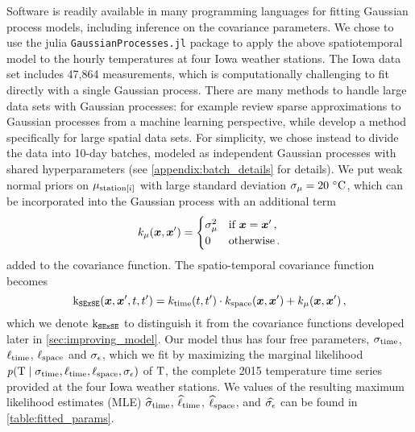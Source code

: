 Software is readily available in many programming languages for fitting Gaussian process models, including inference on the covariance parameters. We chose to use the julia \texttt{GaussianProcesses.jl} package to apply the above spatiotemporal model to the hourly temperatures at four Iowa weather stations.
The Iowa data set includes 47,864 measurements, which is computationally challenging to fit directly with a single Gaussian process.
There are many methods to handle large data sets with Gaussian processes: for example \citet{quinonero2007approximation} review sparse approximations to Gaussian processes from a machine learning perspective, while \citet{banerjee2008gaussian} develop a method specifically for large spatial data sets.
For simplicity, we chose instead to divide the data into 10-day batches, modeled as independent Gaussian processes with shared hyperparameters (see \autoref{appendix:batch_details} for details).
We put weak normal priors on \(\mu_{\mathrm{station}\left\lbrack i\right\rbrack}\) with large standard deviation \(\sigma_{\mu}=20\,{\,^\circ}{}\mathrm{C}\), which can be incorporated into the Gaussian process with an additional term
\begin{equation}
    k_{\mu}(\bm{x}, \bm{x}') = \begin{cases}
\sigma_\mu^2 &\text{if } \bm{x} = \bm{x}'\,, \\
0 &\text{otherwise}\,.
\end{cases}
\end{equation}
added to the covariance function.
The spatio-temporal covariance function becomes
\begin{equation}
    \operatorname{k_{\mathtt{SExSE}}}(\bm{x},\bm{x}',t,t') = k_{\mathrm{time}}(t,t') \cdot k_{\mathrm{space}}(\bm{x}, \bm{x}') + k_\mu(\bm{x}, \bm{x}') \,,
    \label{eq:ksese}
\end{equation}
which we denote \(\operatorname{k_{\mathtt{SExSE}}}\) to distinguish it from the covariance functions developed later in \autoref{sec:improving_model}.
Our model thus has four free parameters, \(\sigma_{\mathrm{time}}\), \(\ell_{\mathrm{time}}\), \(\ell_{\mathrm{space}}\) and \(\sigma_{\epsilon}\), which we fit by maximizing the marginal likelihood \( \prob\del{ \Temp \mid {\sigma_{\subtime},\ell_{\subtime},\ell_{\subspace},\sigman} }\) of \(\mathrm{T}\), the complete 2015 temperature time series provided at the four Iowa weather stations.
We values of the resulting maximum likelihood estimates (MLE) 
\(\widehat\sigma_{\mathrm{time}}\), \(\widehat\ell_{\mathrm{time}}\), \(\widehat\ell_{\mathrm{space}}\), and \(\widehat{\sigma_{\epsilon}}\)
can be found in \autoref{table:fitted_params}.

